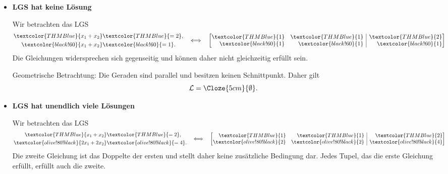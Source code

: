 \begin{itemize}[leftmargin=1.6em,itemsep=1.2em]
  \item
    \begin{minipage}[t]{\linewidth}
    \textbf{LGS hat keine Lösung}\par\smallskip
    \noindent
    \begin{minipage}[c]{0.64\linewidth}
      Wir betrachten das LGS
      \[
        \begin{aligned}
          \textcolor{THMBlue}{x_1+x_2}&\textcolor{THMBlue}{=2},\\
          \textcolor{black!60}{x_1+x_2}&\textcolor{black!60}{=1}.
        \end{aligned}
        \quad\Longleftrightarrow\quad
        \left[
          \begin{array}{@{}rr|r@{}}
            \textcolor{THMBlue}{1}&\textcolor{THMBlue}{1}&\textcolor{THMBlue}{2}\\
            \textcolor{black!60}{1}&\textcolor{black!60}{1}&\textcolor{black!60}{1}
          \end{array}
        \right]
      \]
      Die Gleichungen widersprechen sich gegenseitig und können daher
      nicht gleichzeitig erfüllt sein.

      \smallskip
      Geometrische Betrachtung: Die Geraden sind parallel und besitzen
      keinen Schnittpunkt. Daher gilt
      \[
        \mathcal{L}=\Cloze{5cm}{\emptyset}.
      \]
    \end{minipage}\hfill
    \begin{minipage}[c]{0.32\linewidth}
      \centering
    \end{minipage}
    \end{minipage}

  \item
    \begin{minipage}[t]{\linewidth}
    \textbf{LGS hat unendlich viele Lösungen}\par\smallskip
    \noindent
    \begin{minipage}[c]{0.64\linewidth}
      Wir betrachten das LGS
      \[
        \begin{aligned}
          \textcolor{THMBlue}{x_1+x_2}&\textcolor{THMBlue}{=2},\\
          \textcolor{olive!80!black}{2x_1+2x_2}&\textcolor{olive!80!black}{=4}.
        \end{aligned}
        \quad\Longleftrightarrow\quad
        \left[
          \begin{array}{@{}rr|r@{}}
            \textcolor{THMBlue}{1}&\textcolor{THMBlue}{1}&\textcolor{THMBlue}{2}\\
            \textcolor{olive!80!black}{2}&\textcolor{olive!80!black}{2}&\textcolor{olive!80!black}{4}
          \end{array}
        \right]
      \]
      Die zweite Gleichung ist das Doppelte der ersten und stellt daher
      keine zusätzliche Bedingung dar. Jedes Tupel,
      das die erste Gleichung erfüllt, erfüllt auch die zweite.


\end{minipage}
\end{minipage}
\end{itemize}
